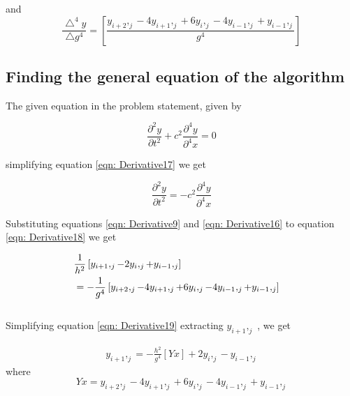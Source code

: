 \documentclass[conference]{IEEEtran}
\begin{document}
	and 
	\begin{equation}
		\label{eqn: Derivative16}
		\frac{\bigtriangleup^4 y}{\bigtriangleup g^4} =\left[\frac{y_{i+2},_{j} - 4 y_{i+1},_{j} + 6 y_{i},_{j} - 4 y_{i-1},_{j} + y_{i-1},_{j}}{g^4} \right]
	\end{equation}

	\subsection{Finding the general equation of the algorithm}
	The given equation in the problem statement, given by 
	
	\begin{equation}
		\label{eqn: Derivative17}
		\frac{\partial^2 y}{\partial t^2}  + c^2 \frac{\partial^4 y}{\partial^4 x} = 0
	\end{equation}
	
	simplifying equation \eqref{eqn: Derivative17} we get
	
	\begin{equation}
		\label{eqn: Derivative18}
		\frac{\partial^2 y}{\partial t^2}  = - c^2 \frac{\partial^4 y}{\partial^4 x}
	\end{equation}

	Substituting equations \eqref{eqn: Derivative9} and \eqref{eqn: Derivative16} to equation \eqref{eqn: Derivative18} we get
	
	\begin{align}
		\label{eqn: Derivative19}
		&\frac{1}{h^2}\left[{y_{i+1},_{j} - 2 y_{i},_{j} + y_{i-1},_{j}}\right]&\\
		&= - \frac{1}{g^4}\left[{y_{i+2},_{j} - 4 y_{i+1},_{j} + 6 y_{i},_{j} - 4 y_{i-1},_{j} + y_{i-1},_{j}} \right]\notag
	\end{align}\\
	
	Simplifying equation \eqref{eqn: Derivative19} extracting \begin{math}y_{i+1},_{j}\end{math} , we get
	
	\begin{align}
		\label{eqn: Derivative20}
		y_{i+1},_{j} = 
		-\frac{h^2}{g^4}\left[ Yx\right] + 2 y_{i},_{j} - y_{i-1},_{j}
	\end{align}
	where 
	\begin{equation}
		\label{eqn: Derivative21}
		Yx  = {y_{i+2},_{j} - 4 y_{i+1},_{j} + 6 y_{i},_{j} - 4 y_{i-1},_{j} + y_{i-1},_{j}}
	\end{equation}
\end{document}
